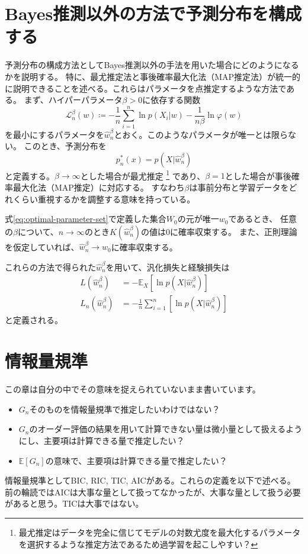 \documentclass[dvipdfmx]{jsarticle}
\begin{document}
\newpage

\section{Bayes推測以外の方法で予測分布を構成する}
予測分布の構成方法としてBayes推測以外の手法を用いた場合にどのようになるかを説明する。
特に、最尤推定法と事後確率最大化法（MAP推定法）が統一的に説明できることを述べる。これらはパラメータを点推定するような方法である。
まず、ハイパーパラメータ$\beta>0$に依存する関数
\begin{equation}
    \mathcal{L}_n^{\beta}(w) \coloneqq -\frac{1}{n}\sum_{i=1}^{n}\ln{p(X_i|w)} - \frac{1}{n\beta}\ln{\varphi(w)}
\end{equation}
を最小にするパラメータを$\hat{w}^{\beta}_{n}$とおく。このようなパラメータが唯一とは限らない。
このとき、予測分布を
\begin{equation}
    p_n^{*}(x) = p(X|\hat{w}^{\beta}_{n})
\end{equation}
と定義する。$\beta\to\infty$とした場合が最尤推定
\footnote{
    最尤推定はデータを完全に信じてモデルの対数尤度を最大化するパラメータを選択するような推定方法であるため過学習を起こしやすい？
}
であり、$\beta=1$とした場合が事後確率最大化法（MAP推定）に対応する。
すなわち$\beta$は事前分布と学習データをどれくらい重視するかを調整する意味を持っている。


\begin{mybox}[推定量の一致性]
    式\eqref{eq:optimal-parameter-set}で定義した集合$W_0$の元が唯一$w_0$であるとき、
    任意の$\beta$について、$n\to\infty$のとき$K(\hat{w}_n^{\beta})$の値は$0$に確率収束する。
    また、正則理論を仮定していれば、$\hat{w}_n^{\beta}\to w_0$に確率収束する。
\end{mybox}

これらの方法で得られた$\hat{w}_n^{\beta}$を用いて、汎化損失と経験損失は
\begin{align}
    L(\hat{w}_n^{\beta}) &= -\mathbb{E}_X[\ln{p(X|\hat{w}_n^{\beta})}] \\
    L_n(\hat{w}_n^{\beta}) &= -\frac{1}{n}\sum_{i=1}^{n}[\ln{p(X|\hat{w}_n^{\beta})}]
\end{align}
と定義される。



\newpage

\section{情報量規準}
この章は自分の中でその意味を捉えられていないまま書いています。
\begin{itemize}
    \item $G_n$そのものを情報量規準で推定したいわけではない？
    \item $G_n$のオーダー評価の結果を用いて計算できない量は微小量として扱えるようにし、主要項は計算できる量で推定したい？
    \item $\mathbb{E}[G_n]$の意味で、主要項は計算できる量で推定したい？
\end{itemize}
情報量規準としてBIC, RIC, TIC, AICがある。これらの定義を以下で述べる。
前の輪読ではAICは大事な量として扱ってなかったが、大事な量として扱う必要があると思う。TICは大事ではない。
\end{document}
